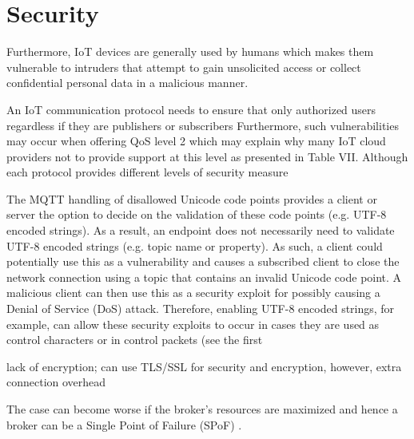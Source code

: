 \section{Security}
Furthermore,
IoT devices are generally used by humans which makes them
vulnerable to intruders that attempt to gain unsolicited access
or collect confidential personal data in a malicious manner.
\cite[23]{protocols}

An IoT
communication protocol needs to ensure that only authorized
users regardless if they are publishers or subscribers
Furthermore, such vulnerabilities may occur when
offering QoS level 2 which may explain why many IoT cloud
providers not to provide support at this level as presented in
Table VII. 
Although each protocol provides different levels of
security measure\cite[23]{protocols}


The MQTT handling of disallowed Unicode code points
provides a client or server the option to decide on the
validation of these code points (e.g. UTF-8 encoded strings).
As a result, an endpoint does not necessarily need to validate
UTF-8 encoded strings (e.g. topic name or property). As
such, a client could potentially use this as a vulnerability and
causes a subscribed client to close the network connection
using a topic that contains an invalid Unicode code point. A
malicious client can then use this as a security exploit for
possibly causing a Denial of Service (DoS) attack.
Therefore, enabling UTF-8 encoded strings, for example,
can allow these security exploits to occur in cases they are
used as control characters or in control packets (see the first
\cite[11]{protocols}

lack of encryption; can use TLS/SSL for security and
encryption, however, extra connection overhead \cite[27]{protocols}

The case can become worse if the broker’s resources are maximized
and hence a broker can be a Single Point of Failure (SPoF) \cite[19]{protocols}.

\nocite{*}


